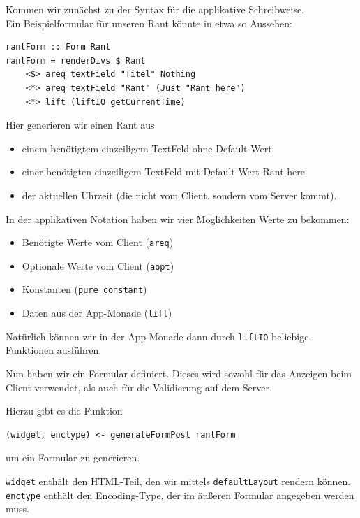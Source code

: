\documentclass{beamer}
\begin{document}
\begin{frame}[fragile]
Kommen wir zunächst zu der Syntax für die applikative Schreibweise.\\\pause
Ein Beispielformular für unseren Rant könnte in etwa so Aussehen:
\begin{verbatim}
rantForm :: Form Rant
rantForm = renderDivs $ Rant
    <$> areq textField "Titel" Nothing
    <*> areq textField "Rant" (Just "Rant here")
    <*> lift (liftIO getCurrentTime)
\end{verbatim}
\pause
Hier generieren wir einen Rant aus
\begin{itemize}
 \item einem benötigtem einzeiligem TextFeld ohne Default-Wert
 \item einer benötigten einzeiligem TextFeld mit Default-Wert \glqq Rant here\grqq
 \item der aktuellen Uhrzeit (die nicht vom Client, sondern vom Server kommt).
\end{itemize}
\end{frame}

\begin{frame}[fragile]
In der applikativen Notation haben wir vier Möglichkeiten Werte zu bekommen:\pause
\begin{itemize}
 \item Benötigte Werte vom Client (\texttt{areq})
 \pause
 \item Optionale Werte vom Client (\texttt{aopt})
 \pause
 \item Konstanten (\texttt{pure constant})
 \pause
 \item Daten aus der App-Monade (\texttt{lift})
 \pause
\end{itemize}
\bigskip

Natürlich können wir in der App-Monade dann durch \texttt{liftIO} beliebige Funktionen ausführen.
\end{frame}

\begin{frame}[fragile]
Nun haben wir ein Formular definiert. Dieses wird sowohl für das Anzeigen beim Client verwendet, als auch für die Validierung auf dem Server.\\\par\pause

Hierzu gibt es die Funktion
\begin{verbatim}
(widget, enctype) <- generateFormPost rantForm
\end{verbatim}
um ein Formular zu generieren.\pause \\
\bigskip

\texttt{widget} enthält den HTML-Teil, den wir mittels \texttt{defaultLayout} rendern können. \texttt{enctype} enthält den Encoding-Type, der im äußeren Formular angegeben werden muss.
\end{frame}
\end{document}
